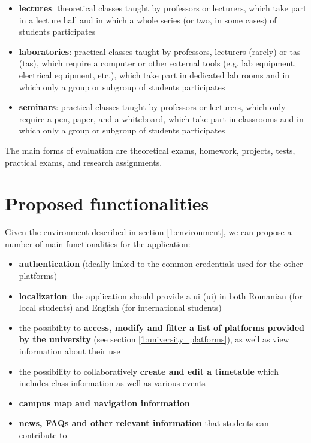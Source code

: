     \begin{itemize}
        \item \textbf{lectures}: theoretical classes taught by professors or lecturers, which take part in a lecture hall and in which a whole series (or two, in some cases) of students participates
        \item \textbf{laboratories}: practical classes taught by professors, lecturers (rarely) or \acrshort{ta}s (\acrlong{ta}s), which require a computer or other external tools (e.g. lab equipment, electrical equipment, etc.), which take part in dedicated lab rooms and in which only a group or subgroup of students participates
        \item \textbf{seminars}: practical classes taught by professors or lecturers, which only require a pen, paper, and a whiteboard, which take part in classrooms and in which only a group or subgroup of students participates
    \end{itemize}
    
    The main forms of evaluation are theoretical exams, homework, projects, tests, practical exams, and research assignments.
        
\section{Proposed functionalities} \label{1:functionalities}

    Given the environment described in section \ref{1:environment}, we can propose a number of main functionalities for the application:
    
    \begin{itemize}
        \item \textbf{authentication} (ideally linked to the common credentials used for the other platforms)
        \item \textbf{localization}: the application should provide a \acrshort{ui} (\acrlong{ui}) in both Romanian (for local students) and English (for international students)
        \item the possibility to \textbf{access, modify and filter a list of platforms provided by the university} (see section \ref{1:university_platforms}), as well as view information about their use
        \item the possibility to collaboratively \textbf{create and edit a timetable} which includes class information as well as various events
        \item \textbf{campus map and navigation information}
        \item \textbf{news, FAQs and other relevant information} that students can contribute to
    \end{itemize}

